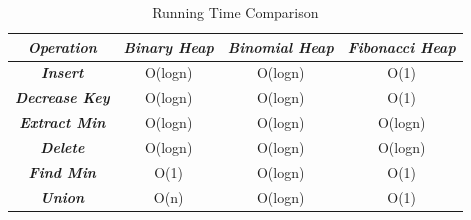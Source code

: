 \documentclass[14pt,a4paper]{report}
\begin{document}
\begin{table}[h]
\centering
\begin{tabular}{|c|c|c|c|}
\hline
 
{\textit{\textbf{Operation}}}                            & {\textit{\textbf{Binary Heap}}} & {\textit{\textbf{Binomial Heap}}} & {\textit{\textbf{Fibonacci Heap}}} \\ \hline
 
{\textit{\textbf{Insert}}}       & O(logn)                                              & O(logn)                                                & O(1)                                                    \\ \hline
{\textit{\textbf{Decrease Key}}} & O(logn)                                              & O(logn)                                                & O(1)                                                    \\ \hline
{\textit{\textbf{Extract Min}}}  & O(logn)                                              & O(logn)                                                & O(logn)                                                 \\ \hline
{\textit{\textbf{Delete}}}       & O(logn)                                              & O(logn)                                                & O(logn)                                                 \\ \hline
{\textit{\textbf{Find Min}}}     & O(1)                                                 & O(logn)                                                & O(1)                                                    \\ \hline
{\textit{\textbf{Union}}}                          & O(n)                                                 & O(logn)                                                & O(1)                                                    \\ \hline
\end{tabular}
\caption{Running Time Comparison}
\end{table}
\end{document}

